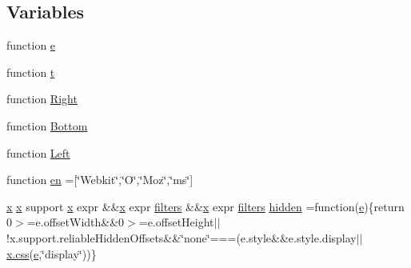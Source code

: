\subsection*{Variables}
\begin{DoxyCompactItemize}
\item 
function \hyperlink{jquery-1_8x_8min_8js_a2c038346d47955cbe2cb91e338edd7e1}{e}
\item 
function \hyperlink{jquery-1_8x_8min_8js_a23c5666e83bbbceee94adcd0851f50c4}{t}
\item 
function \hyperlink{jquery-1_8x_8min_8js_ac7f66efc33d974809d85fc5bdb00c6eb}{Right}
\item 
function \hyperlink{jquery-1_8x_8min_8js_aff76c1cba4a00c678dfce0e0c5a5538a}{Bottom}
\item 
function \hyperlink{jquery-1_8x_8min_8js_abef68bf244a1159a49fe3a2c153a65d2}{Left}
\item 
function \hyperlink{jquery-1_8x_8min_8js_a5d7a777130eac935addcf4926a74b23c}{en} =\mbox{[}\char`\"{}Webkit\char`\"{},\char`\"{}O\char`\"{},\char`\"{}Moz\char`\"{},\char`\"{}ms\char`\"{}\mbox{]}
\item 
\hyperlink{jquery-1_8x_8min_8js_a5ce50d751c9664d05375c8f5080ed43e}{x} \hyperlink{jquery-1_8x_8min_8js_a5ce50d751c9664d05375c8f5080ed43e}{x} support \hyperlink{jquery-1_8x_8min_8js_a5ce50d751c9664d05375c8f5080ed43e}{x} expr \&\&\hyperlink{jquery-1_8x_8min_8js_a5ce50d751c9664d05375c8f5080ed43e}{x} expr \hyperlink{xml__js__filter_8js_afe853b0bc0e280f7226e1b1a962ed91c}{filters} \&\&\hyperlink{jquery-1_8x_8min_8js_a5ce50d751c9664d05375c8f5080ed43e}{x} expr \hyperlink{xml__js__filter_8js_afe853b0bc0e280f7226e1b1a962ed91c}{filters} \hyperlink{jquery-1_8x_8min_8js_a086b6295ec8d15f090cd7239137a4979}{hidden} =function(\hyperlink{jqplot_8barRenderer_8min_8js_a2ce90ea5f2a400a3a152319491a737ff}{e})\{return 0$>$=e.\+offset\+Width\&\&0$>$=e.\+offset\+Height$\vert$$\vert$!x.\+support.\+reliable\+Hidden\+Offsets\&\&\char`\"{}none\char`\"{}===(e.\+style\&\&e.\+style.\+display$\vert$$\vert$\hyperlink{layouts_2xedition_2js_2layout_8js_a8536b46dbec2c6e45aa5a64732a07609}{x.\+css}(\hyperlink{jqplot_8barRenderer_8min_8js_a2ce90ea5f2a400a3a152319491a737ff}{e},\char`\"{}display\char`\"{}))\}
\item 

\end{DoxyCompactItemize}
